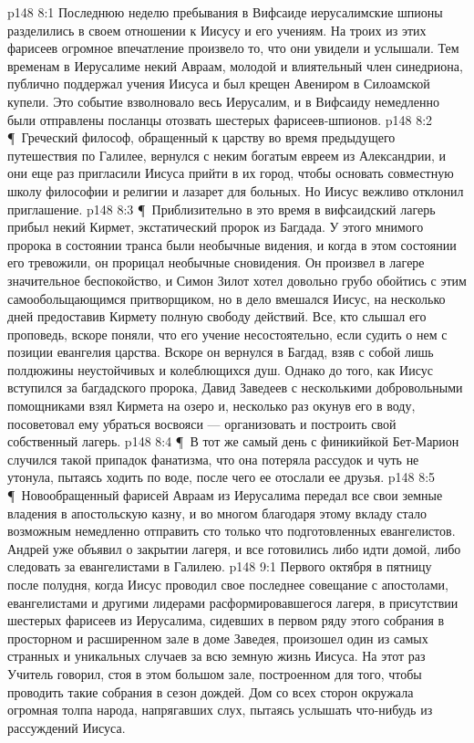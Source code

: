 \vs p148 8:1 Последнюю неделю пребывания в Вифсаиде иерусалимские шпионы разделились в своем отношении к Иисусу и его учениям. На троих из этих фарисеев огромное впечатление произвело то, что они увидели и услышали. Тем временам в Иерусалиме некий Авраам, молодой и влиятельный член синедриона, публично поддержал учения Иисуса и был крещен Авениром в Силоамской купели. Это событие взволновало весь Иерусалим, и в Вифсаиду немедленно были отправлены посланцы отозвать шестерых фарисеев\hyp{}шпионов.
\vs p148 8:2 \P\ Греческий философ, обращенный к царству во время предыдущего путешествия по Галилее, вернулся с неким богатым евреем из Александрии, и они еще раз пригласили Иисуса прийти в их город, чтобы основать совместную школу философии и религии и лазарет для больных. Но Иисус вежливо отклонил приглашение.
\vs p148 8:3 \P\ Приблизительно в это время в вифсаидский лагерь прибыл некий Кирмет, экстатический пророк из Багдада. У этого мнимого пророка в состоянии транса были необычные видения, и когда в этом состоянии его тревожили, он прорицал необычные сновидения. Он произвел в лагере значительное беспокойство, и Симон Зилот хотел довольно грубо обойтись с этим самообольщающимся притворщиком, но в дело вмешался Иисус, на несколько дней предоставив Кирмету полную свободу действий. Все, кто слышал его проповедь, вскоре поняли, что его учение несостоятельно, если судить о нем с позиции евангелия царства. Вскоре он вернулся в Багдад, взяв с собой лишь полдюжины неустойчивых и колеблющихся душ. Однако до того, как Иисус вступился за багдадского пророка, Давид Заведеев с несколькими добровольными помощниками взял Кирмета на озеро и, несколько раз окунув его в воду, посоветовал ему убраться восвояси --- организовать и построить свой собственный лагерь.
\vs p148 8:4 \P\ В тот же самый день с финикийкой Бет\hyp{}Марион случился такой припадок фанатизма, что она потеряла рассудок и чуть не утонула, пытаясь ходить по воде, после чего ее отослали ее друзья.
\vs p148 8:5 \P\ Новообращенный фарисей Авраам из Иерусалима передал все свои земные владения в апостольскую казну, и во многом благодаря этому вкладу стало возможным немедленно отправить сто только что подготовленных евангелистов. Андрей уже объявил о закрытии лагеря, и все готовились либо идти домой, либо следовать за евангелистами в Галилею.
\vs p148 9:1 Первого октября в пятницу после полудня, когда Иисус проводил свое последнее совещание с апостолами, евангелистами и другими лидерами расформировавшегося лагеря, в присутствии шестерых фарисеев из Иерусалима, сидевших в первом ряду этого собрания в просторном и расширенном зале в доме Заведея, произошел один из самых странных и уникальных случаев за всю земную жизнь Иисуса. На этот раз Учитель говорил, стоя в этом большом зале, построенном для того, чтобы проводить такие собрания в сезон дождей. Дом со всех сторон окружала огромная толпа народа, напрягавших слух, пытаясь услышать что\hyp{}нибудь из рассуждений Иисуса.
